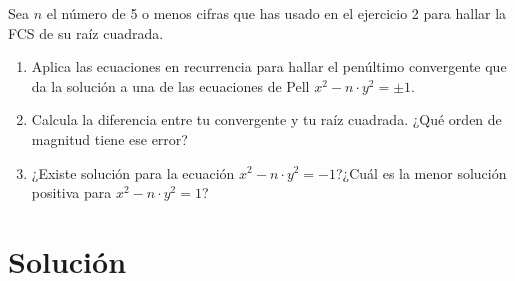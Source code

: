 	Sea $n$ el número de 5 o menos cifras que has usado en el ejercicio 2 para hallar la FCS de su raíz cuadrada.
	\begin{enumerate}
		\item Aplica las ecuaciones en recurrencia para hallar el penúltimo convergente que da la solución a una
		de las ecuaciones de Pell $x^2 - n \cdot y^2 = \pm 1$.
		\item Calcula la diferencia entre tu convergente y tu raíz cuadrada. ¿Qué orden de magnitud tiene ese error?
		\item ¿Existe solución para la ecuación $x^2 - n \cdot y^2 = -1$?¿Cuál es la menor solución positiva para
		$x^2 - n \cdot y^2 = 1$?
	\end{enumerate}

\section*{Solución}
